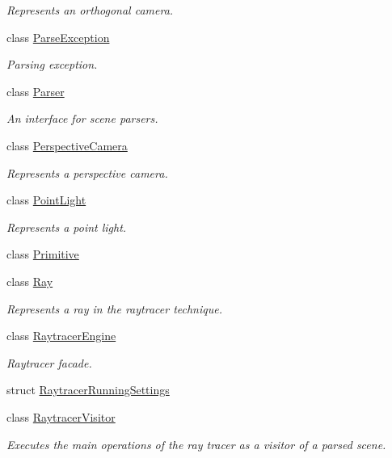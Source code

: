 \begin{DoxyCompactItemize}
\begin{DoxyCompactList}\small\item\em Represents an orthogonal camera. \end{DoxyCompactList}\item 
class \mbox{\hyperlink{classomg_1_1_parse_exception}{Parse\+Exception}}
\begin{DoxyCompactList}\small\item\em Parsing exception. \end{DoxyCompactList}\item 
class \mbox{\hyperlink{classomg_1_1_parser}{Parser}}
\begin{DoxyCompactList}\small\item\em An interface for scene parsers. \end{DoxyCompactList}\item 
class \mbox{\hyperlink{classomg_1_1_perspective_camera}{Perspective\+Camera}}
\begin{DoxyCompactList}\small\item\em Represents a perspective camera. \end{DoxyCompactList}\item 
class \mbox{\hyperlink{classomg_1_1_point_light}{Point\+Light}}
\begin{DoxyCompactList}\small\item\em Represents a point light. \end{DoxyCompactList}\item 
class \mbox{\hyperlink{classomg_1_1_primitive}{Primitive}}
\item 
class \mbox{\hyperlink{classomg_1_1_ray}{Ray}}
\begin{DoxyCompactList}\small\item\em Represents a ray in the raytracer technique. \end{DoxyCompactList}\item 
class \mbox{\hyperlink{classomg_1_1_raytracer_engine}{Raytracer\+Engine}}
\begin{DoxyCompactList}\small\item\em Raytracer facade. \end{DoxyCompactList}\item 
struct \mbox{\hyperlink{structomg_1_1_raytracer_running_settings}{Raytracer\+Running\+Settings}}
\item 
class \mbox{\hyperlink{classomg_1_1_raytracer_visitor}{Raytracer\+Visitor}}
\begin{DoxyCompactList}\small\item\em Executes the main operations of the ray tracer as a visitor of a parsed scene. \end{DoxyCompactList}\item 

\end{DoxyCompactItemize}
